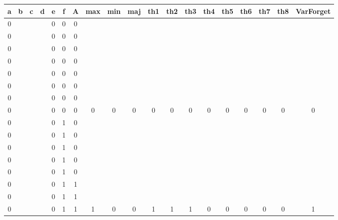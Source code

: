\begin{table}[!tb]
    \centering
    \begin{tabular}{|c|c|c|c|c|c|c|c|c|c|c|c|c|c|c|c|c|c|c|}
        \hline
        \textbf{a} & \textbf{b} & \textbf{c} & \textbf{d} & \textbf{e} & \textbf{f} & \textbf{A} & \textbf{max} & \textbf{min} & \textbf{maj} & \textbf{th1} & \textbf{th2} & \textbf{th3} & \textbf{th4} & \textbf{th5} & \textbf{th6} & \textbf{th7} & \textbf{th8} & \textbf{VarForget} \\ \hline
        \rowcolor{gray!40} 0 &  &  &  & 0 & 0 & 0 &  &  &  &  &  &  &  &  &  &  &  &  \\ \hline
        \rowcolor{gray!40} 0 &  &  &  & 0 & 0 & 0 &  &  &  &  &  &  &  &  &  &  &  &  \\ \hline
        \rowcolor{gray!40} 0 &  &  &  & 0 & 0 & 0 &  &  &  &  &  &  &  &  &  &  &  &  \\ \hline
        \rowcolor{gray!40} 0 &  &  &  & 0 & 0 & 0 &  &  &  &  &  &  &  &  &  &  &  &  \\ \hline
        \rowcolor{gray!40} 0 &  &  &  & 0 & 0 & 0 &  &  &  &  &  &  &  &  &  &  &  &  \\ \hline
        \rowcolor{gray!40} 0 &  &  &  & 0 & 0 & 0 &  &  &  &  &  &  &  &  &  &  &  &  \\ \hline
        \rowcolor{gray!40} 0 &  &  &  & 0 & 0 & 0 &  &  &  &  &  &  &  &  &  &  &  &  \\ \hline
        \rowcolor{gray!40} 0 &  &  &  & 0 & 0 & 0 & 0 & 0 & 0 & 0 & 0 & 0 & 0 & 0 & 0 & 0 & 0 & 0 \\ \hline
        \rowcolor{blue!40} 0 &  &  &  & 0 & 1 & 0 &  &  &  &  &  &  &  &  &  &  &  &  \\ \hline
        \rowcolor{blue!40} 0 &  &  &  & 0 & 1 & 0 &  &  &  &  &  &  &  &  &  &  &  &  \\ \hline
        \rowcolor{blue!40} 0 &  &  &  & 0 & 1 & 0 &  &  &  &  &  &  &  &  &  &  &  &  \\ \hline
        \rowcolor{blue!40} 0 &  &  &  & 0 & 1 & 0 &  &  &  &  &  &  &  &  &  &  &  &  \\ \hline
        \rowcolor{blue!40} 0 &  &  &  & 0 & 1 & 0 &  &  &  &  &  &  &  &  &  &  &  &  \\ \hline
        \rowcolor{blue!40} 0 &  &  &  & 0 & 1 & 1 &  &  &  &  &  &  &  &  &  &  &  &  \\ \hline
        \rowcolor{blue!40} 0 &  &  &  & 0 & 1 & 1 &  &  &  &  &  &  &  &  &  &  &  &  \\ \hline
        \rowcolor{blue!40} 0 &  &  &  & 0 & 1 & 1 & 1 & 0 & 0 & 1 & 1 & 1 & 0 & 0 & 0 & 0 & 0 & 1 \\ \hline

\end{tabular}
\end{table}
